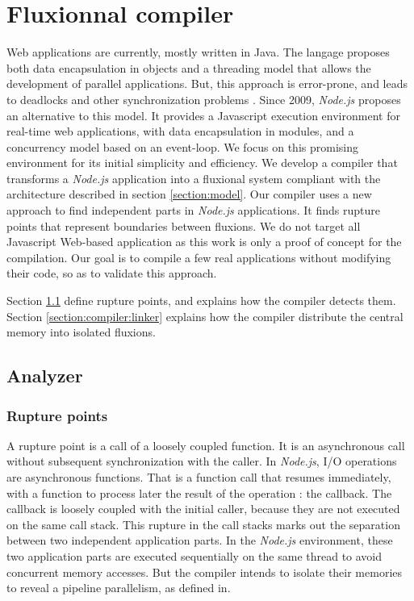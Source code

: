 \section{Fluxionnal compiler} \label{section:compiler}

Web applications are currently, mostly written in Java.
The langage proposes both data encapsulation in objects and a threading model that allows the development of parallel applications.
But, this approach is error-prone, and leads to deadlocks and other synchronization problems \cite{Adya2002}.
Since 2009, \textit{Node.js} proposes an alternative to this model.
It provides a Javascript execution environment for real-time web applications, with data encapsulation in modules, and a concurrency model based on an event-loop.
We focus on this promising environment for its initial simplicity and efficiency.
We develop a compiler that transforms a \textit{Node.js} application into a fluxional system compliant with the architecture described in section \ref{section:model}.
Our compiler uses a new approach to find independent parts in \textit{Node.js} applications.
It finds rupture points that represent boundaries between fluxions.
We do not target all Javascript Web-based application as this work is only a proof of concept for the compilation.
Our goal is to compile a few real applications without modifying their code, so as to validate this approach.

Section \ref{section:compiler:analyzer} define rupture points, and explains how the compiler detects them.
Section \ref{section:compiler:linker} explains how the compiler distribute the central memory into isolated fluxions.

\subsection{Analyzer} \label{section:compiler:analyzer}

\subsubsection{Rupture points} \label{section:compiler:analyzer:rupture}

A rupture point is a call of a loosely coupled function.
It is an asynchronous call without subsequent synchronization with the caller.
In \textit{Node.js}, I/O operations are asynchronous functions.
That is a function call that resumes immediately, with a function to process later the result of the operation : the callback.
The callback is loosely coupled with the initial caller, because they are not executed on the same call stack.
This rupture in the call stacks marks out the separation between two independent application parts.
In the \textit{Node.js} environment, these two application parts are executed sequentially on the same thread to avoid concurrent memory accesses.
But the compiler intends to isolate their memories to reveal a pipeline parallelism, as defined in\cite{Gordon2006}.

